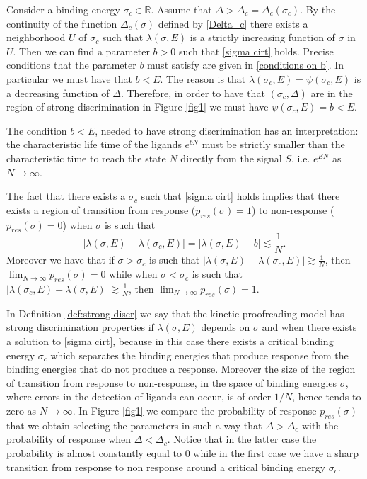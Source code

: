 \documentclass{article}
\numberwithin{equation}{section}
\theoremstyle{plain}
\begin{document}
Consider a binding energy $ \sigma_c \in \mathbb R $. Assume that $\Delta > \Delta_c = \Delta_c( \sigma_c) $. By the continuity of the function  $\Delta_c(\sigma) $ defined by \eqref{Delta_c} there exists a neighborhood  $U$ of $\sigma_c $ such that $\lambda (\sigma, E )$ is a strictly increasing function of $\sigma$ in $U$.
Then we can find a parameter $b>0 $ such that \eqref{sigma cirt} holds. 
Precise conditions that the parameter $b$ must satisfy are given in  \eqref{conditions on b}. In particular we must have that $b< E $. The reason is that $\lambda(\sigma_c, E)=\psi(\sigma_c, E) $ is a decreasing function of $\Delta$. Therefore, in order to have that $(\sigma_c, \Delta) $ are in the region of strong discrimination in Figure \ref{fig1} we must have $\psi(\sigma_c, E ) = b < E $. 



The condition $b < E$, needed to have strong discrimination has an interpretation: the characteristic life time of the ligands $e^{bN}$ must be strictly smaller than the characteristic time to reach the state $N$ directly from the signal $S$, i.e. $e^{EN} $ as $N \to \infty $.

The fact that there exists a $\sigma_c $ such that  \eqref{sigma cirt} holds implies that there exists a region of transition from response ($p_{res}(\sigma ) =1$) to non-response ($p_{res}(\sigma ) =0$) when $\sigma $ is such that 
\[ 
|\lambda (\sigma, E ) - \lambda(\sigma_c, E ) |= |\lambda (\sigma , E) -b | \lesssim \frac{1}{N}.
\] 
Moreover we have that if $\sigma > \sigma_c $ is such that $ | \lambda (\sigma , E) - \lambda(\sigma_c, E) | \gtrsim \frac{1}{N} $, then $\lim_{N\to \infty } p_{res} (\sigma ) =0 $ while when $\sigma < \sigma_c $ is such that $| \lambda (\sigma_c , E) - \lambda(\sigma, E ) | \gtrsim \frac{1}{N} $, then $\lim_{N\to \infty } p_{res} (\sigma ) =1 $. 

In Definition \ref{def:strong discr} we say that the kinetic proofreading model has strong discrimination properties if $\lambda(\sigma, E) $ depends on $\sigma$ and when there exists a solution to \eqref{sigma cirt}, because in this case there exists a critical binding energy $\sigma_c $ which separates the binding energies that produce response from the binding energies that do not produce a response.
Moreover the size of the region of transition from response to non-response, in the space of binding energies $\sigma$, where errors in the detection of ligands can occur, is of order $1/N$, hence tends to zero as $N \to \infty $. In Figure \ref{fig1} we compare the probability of response $p_{res} (\sigma ) $ that we obtain selecting the parameters in such a way that $\Delta > \Delta_c $ with the probability of response when $\Delta < \Delta_c$.
Notice that in the latter case the probability is almost constantly equal to $0$ while in the first case we have a sharp transition from response to non response around a critical binding energy $\sigma_c$. 
\end{document}
